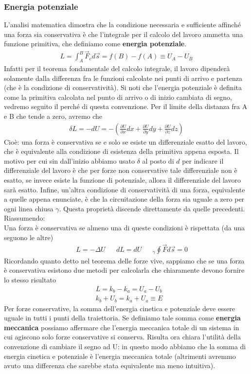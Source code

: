 \documentclass[10pt,a4paper]{article}
\begin{document}
\subsubsection{Energia potenziale}\label{sec:energiapotenziale}
L'analisi matematica dimostra che la condizione necessaria e sufficiente affinché una forza sia conservativa è che l'integrale per il calcolo del lavoro ammetta una funzione primitiva, che definiamo come \textbf{energia potenziale}. 
\begin{align*}
	L = \int_{A}^{B} \vec{F}_c d\vec{s}= f(B)-f(A)\equiv U_A-U_B
\end{align*}
Infatti per il teorema fondamentale del calcolo integrale, il lavoro dipenderà solamente dalla differenza fra le funzioni calcolate nei punti di arrivo e partenza (che è la condizione di conservatività). Si noti che l'energia potenziale è definita come la primitiva calcolata nel punto di arrivo o di inizio cambiata di segno, vedremo seguito il perché di questa convenzione. Per il limite della distanza fra A e B che tende a zero, avremo che
\begin{align*}
\delta L = -dU = -(\frac{\partial U}{\partial x}dx + \frac{\partial U}{\partial y}dy + \frac{\partial U}{\partial z}dz)
\end{align*}
Cioè: una forza è conservativa se e solo se esiste un differenziale esatto del lavoro, che è equivalente alla condizione di esistenza della primitiva appena esposta. Il motivo per cui sin dall'inizio abbiamo usato $\delta$ al posto di $d$ per indicare il differenziale del lavoro è che per forze non conservative tale differenziale non è esatto, se invece esiste la funzione di potenziale, allora il differenziale del lavoro sarà esatto. Infine, un'altra condizione di conservatività di una forza, equivalente a quelle appena enunciate, è che la circuitazione della forza sia uguale a zero per ogni linea chiusa $\gamma$. Questa proprietà discende direttamente da quelle precedenti. Riassumendo:\\
Una forza è conservativa se almeno una di queste condizioni è rispettata (da una seguono le altre)
\begin{align*}
	&&L = -\Delta U&& dL = dU&&_\gamma\oint\vec{F}d\vec{s} = 0  
\end{align*}
Ricordando quanto detto nel teorema delle forze vive, sappiamo che se una forza è conservativa esistono due metodi per calcolarla che chiaramente devono fornire lo stesso risultato
\begin{align*}
	&L = k_b-k_a = U_a-U_b\\
	&k_b+U_b=k_a+U_a \equiv E
\end{align*}
Per forze conservative, la somma dell'energia cinetica e potenziale deve essere uguale in tutti i punti della traiettoria. Se definiamo tale somma come \textbf{energia meccanica} possiamo affermare che l'energia meccanica totale di un sistema in cui agiscono solo forze conservative si conserva. Risulta ora chiara l'utilità della convenzione di cambiare il segno ad U: in questo modo abbiamo che la somma di energia cinetica e potenziale è l'energia meccanica totale (altrimenti avremmo avuto una differenza che sarebbe stata equivalente ma meno intuitiva).
\end{document}
